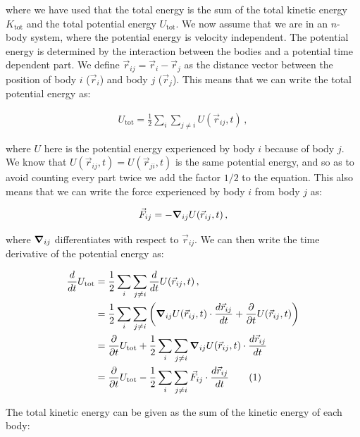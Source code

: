 \documentclass[reprint,english,notitlepage]{revtex4-1}  %
\newcommand\numberthis{\addtocounter{equation}{1}\tag{\theequation}}
\begin{document}
where we have used that the total energy is the sum of the total kinetic energy $K_\text{tot}$ and the total potential energy $U_\text{tot}$. We now assume that we are in an $n$-body system, where the potential energy is velocity independent. The potential energy is determined by the interaction between the bodies and a potential time dependent part. We define $\vec{r}_{ij} = \vec{r}_i - \vec{r}_j$ as the distance vector between the position of body $i$ ($\vec{r}_i$) and body $j$ ($\vec{r}_j$). This means that we can write the total potential energy as:

\begin{align*}
U_\text{tot} = \frac{1}{2}\sum\limits_i \sum\limits_{j\neq i} U(\vec{r}_{ij},t) \, ,
\end{align*}

where $U$ here is the potential energy experienced by body $i$ because of body $j$. We know that $U(\vec{r}_{ij},t) = U(\vec{r}_{ji},t)$ is the same potential energy, and so as to avoid counting every part twice we add the factor $1/2$ to the equation. This also means that we can write the force experienced by body $i$ from body $j$ as:

\begin{align*}
\vec{F}_{ij} = - \gradient_{ij} U(\vec{r}_{ij}, t) \, ,
\end{align*}

where $\gradient_{ij}$ differentiates with respect to $\vec{r}_{ij}$. We can then write the time derivative of the potential energy as:

\begin{align*}
\frac{d}{dt}U_\text{tot} &= \frac{1}{2}\sum\limits_{i} \sum\limits_{j\neq i} \frac{d}{dt} U (\vec{r}_{ij}, t ) \, , \\
&= \frac{1}{2}\sum\limits_{i} \sum\limits_{j\neq i} \bigg( \gradient_{ij} U (\vec{r}_{ij}, t ) \cdot \frac{d\vec{r}_{ij}}{dt} + \frac{\partial }{\partial t} U(\vec{r}_{ij}, t) \bigg) \\
&= \frac{\partial}{\partial t} U_\text{tot} + \frac{1}{2}\sum\limits_{i} \sum\limits_{j\neq i} \gradient_{ij} U (\vec{r}_{ij}, t ) \cdot \frac{d\vec{r}_{ij}}{dt} \\
&= \frac{\partial}{\partial t} U_\text{tot} - \frac{1}{2}\sum\limits_{i} \sum\limits_{j\neq i} \vec{F}_{ij} \cdot \frac{d\vec{r}_{ij}}{dt} \numberthis \label{eq:pot_en_der}
\end{align*}

The total kinetic energy can be given as the sum of the kinetic energy of each body:
\end{document}
